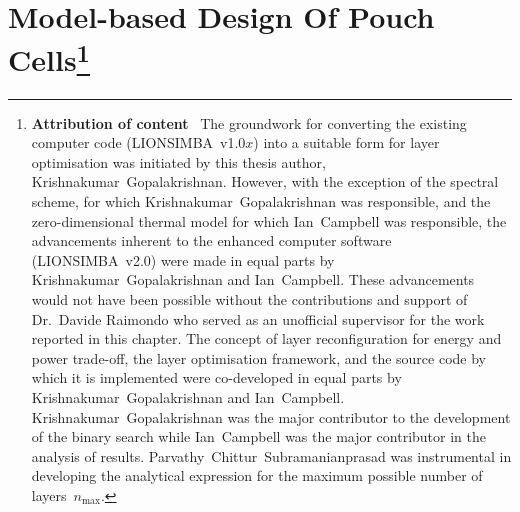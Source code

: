 
\graphicspath{{chapters/layer_opt/figures/}}

\chapter[Model-based Design Of Pouch Cells]{%
    Model-based  Design Of  Pouch Cells\footnote{\textbf{Attribution  of content}  \
        The  groundwork for  converting the  existing computer  code (LIONSIMBA~v1.0$x$)
        into  a suitable  form  for  layer optimisation  was  initiated  by this  thesis
        author, \mbox{Krishnakumar  Gopalakrishnan}. However, with the  exception of the
        spectral scheme,  for which \mbox{Krishnakumar Gopalakrishnan}  was responsible,
        and  the  zero-dimensional  thermal  model for  which  \mbox{Ian  Campbell}  was
        responsible,  the  advancements  inherent  to  the  enhanced  computer  software
        (LIONSIMBA~v2.0) were made in  equal parts by \mbox{Krishnakumar Gopalakrishnan}
        and  \mbox{Ian  Campbell}.  These  advancements would  not  have  been  possible
        without the  contributions and support of  Dr.~Davide Raimondo who served  as an
        unofficial supervisor  for the  work reported  in this  chapter. The  concept of
        layer reconfiguration  for energy  and power  trade-off, the  layer optimisation
        framework, and the  source code by which it is  implemented were co-developed in
        equal  parts  by  \mbox{Krishnakumar Gopalakrishnan}  and  \mbox{Ian  Campbell}.
        \mbox{Krishnakumar Gopalakrishnan} was the  major contributor to the development
        of the binary search while \mbox{Ian  Campbell} was the major contributor in the
        analysis of results. \mbox{Parvathy  Chittur Subramanianprasad} was instrumental
        in  developing the  analytical expression  for  the maximum  possible number  of
    layers~$n_\text{max}$.}%
}\label{ch:modelbaseddesign}

\vspace*{-1em}
\startcontents[chapters]

\bigskip



